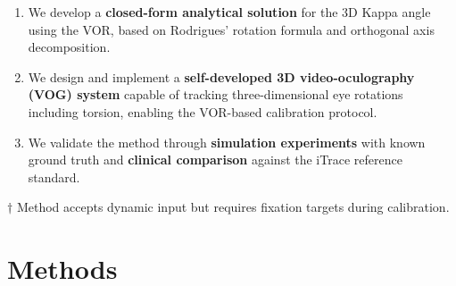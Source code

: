 \documentclass[review,numbers,sort&compress]{elsarticle}
\begin{document}
\begin{enumerate}
    \item We develop a \textbf{closed-form analytical solution} for the 3D Kappa angle using the VOR, based on Rodrigues' rotation formula and orthogonal axis decomposition.
    \item We design and implement a \textbf{self-developed 3D video-oculography (VOG) system} capable of tracking three-dimensional eye rotations including torsion, enabling the VOR-based calibration protocol.
    \item We validate the method through \textbf{simulation experiments} with known ground truth and \textbf{clinical comparison} against the iTrace reference standard.
\end{enumerate}

\begin{table}[t]
\caption{Comparison of Kappa angle estimation methods.}
\label{tab:comparison}
\centering
{}
\vspace{2pt}
\footnotesize $\dagger$ Method accepts dynamic input but requires fixation targets during calibration.
\end{table}

\section{Methods}

\end{document}
